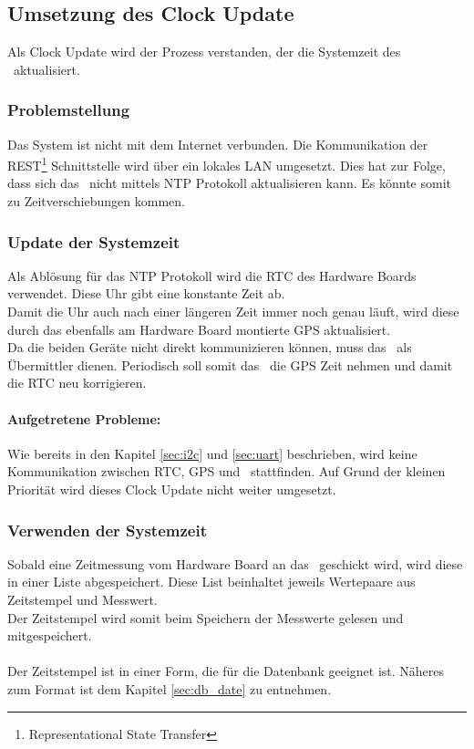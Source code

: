 \subsection{Umsetzung des Clock Update}
Als Clock Update wird der Prozess verstanden, der die Systemzeit des \rpi\ aktualisiert.

\subsubsection{Problemstellung}
Das System ist nicht mit dem Internet verbunden. Die Kommunikation der REST\footnote{Representational State Transfer} Schnittstelle wird über ein lokales LAN umgesetzt. Dies hat zur Folge, dass sich das \rpi\ nicht mittels NTP Protokoll aktualisieren kann. Es könnte somit zu Zeitverschiebungen kommen.

\subsubsection{Update der Systemzeit}
Als Ablösung für das NTP Protokoll wird die RTC des Hardware Boards verwendet. Diese Uhr gibt eine konstante Zeit ab.\\
Damit die Uhr auch nach einer längeren Zeit immer noch genau läuft, wird diese durch das ebenfalls am Hardware Board montierte GPS aktualisiert.\\
Da die beiden Geräte nicht direkt kommunizieren können, muss das \rpi\ als Übermittler dienen. Periodisch soll somit das \rpi\ die GPS Zeit nehmen und damit die RTC neu korrigieren.
\paragraph{Aufgetretene Probleme:} Wie bereits in den Kapitel \ref{sec:i2c} und \ref{sec:uart} beschrieben, wird keine Kommunikation zwischen RTC, GPS und \rpi\ stattfinden. Auf Grund der kleinen Priorität wird dieses Clock Update nicht weiter umgesetzt.

\subsubsection{Verwenden der Systemzeit}
Sobald eine Zeitmessung vom Hardware Board an das \rpi\ geschickt wird, wird diese in einer Liste abgespeichert. Diese List beinhaltet jeweils Wertepaare aus Zeitstempel und Messwert.\\
Der Zeitstempel wird somit beim Speichern der Messwerte gelesen und mitgespeichert.\\
\\
Der Zeitstempel ist in einer Form, die für die Datenbank geeignet ist. Näheres zum Format ist dem Kapitel \ref{sec:db_date} zu entnehmen.